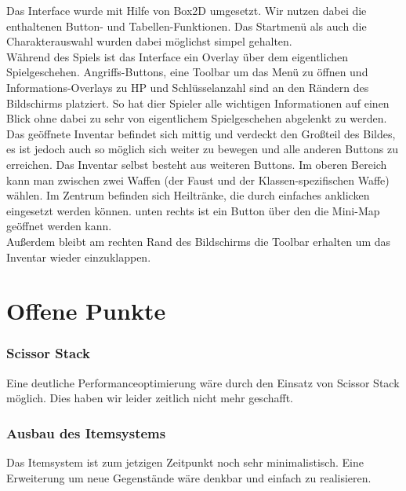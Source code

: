 \documentclass[10pt,a4paper,notitlepage]{scrreprt}
\begin{document}
		Das Interface wurde mit Hilfe von Box2D umgesetzt. Wir nutzen dabei die enthaltenen Button- und Tabellen-Funktionen. Das Startmenü als auch die Charakterauswahl wurden dabei möglichst simpel gehalten.\\
		Während des Spiels ist das Interface ein Overlay über dem eigentlichen Spielgeschehen. Angriffs-Buttons, eine Toolbar um das Menü zu öffnen und Informations-Overlays zu HP und Schlüsselanzahl sind an den Rändern des Bildschirms platziert. So hat dier Spieler alle wichtigen Informationen auf einen Blick ohne dabei zu sehr von eigentlichem Spielgeschehen abgelenkt zu werden.\\
		Das geöffnete Inventar befindet sich mittig und verdeckt den Großteil des Bildes, es ist jedoch auch so möglich sich weiter zu bewegen und alle anderen Buttons zu erreichen. Das Inventar selbst besteht aus weiteren Buttons. Im oberen Bereich kann man zwischen zwei Waffen (der Faust und der Klassen-spezifischen Waffe) wählen. Im Zentrum befinden sich Heiltränke, die durch einfaches anklicken eingesetzt werden können. unten rechts ist ein Button über den die Mini-Map geöffnet werden kann.\\
		Außerdem bleibt am rechten Rand des Bildschirms die Toolbar erhalten um das Inventar wieder einzuklappen.\\

	\section{Offene Punkte}
		\subsubsection{Scissor Stack}
		Eine deutliche Performanceoptimierung wäre durch den Einsatz von Scissor Stack möglich. Dies haben wir leider zeitlich nicht mehr geschafft.
		
		\subsubsection{Ausbau des Itemsystems}
		Das Itemsystem ist zum jetzigen Zeitpunkt noch sehr minimalistisch. Eine Erweiterung um neue Gegenstände wäre denkbar und einfach zu realisieren.
			
\end{document}
